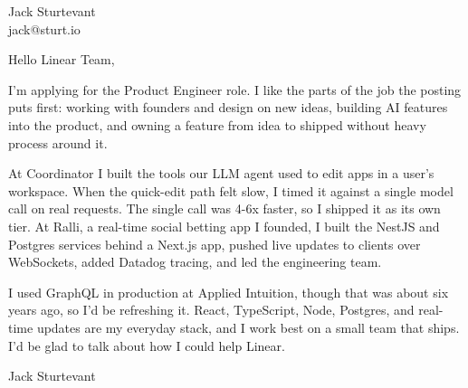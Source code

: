 \documentclass[11pt]{article}
\begin{document}
\raggedright

{\namefont\fontsize{20pt}{24pt}\selectfont Jack Sturtevant}\\[-0.3em]
jack@sturt.io

\vspace{1.2em}

Hello Linear Team,

I'm applying for the Product Engineer role. I like the parts of the job the posting puts first: working with founders and design on new ideas, building AI features into the product, and owning a feature from idea to shipped without heavy process around it.

At Coordinator I built the tools our LLM agent used to edit apps in a user's workspace. When the quick-edit path felt slow, I timed it against a single model call on real requests. The single call was 4-6x faster, so I shipped it as its own tier. At Ralli, a real-time social betting app I founded, I built the NestJS and Postgres services behind a Next.js app, pushed live updates to clients over WebSockets, added Datadog tracing, and led the engineering team.

I used GraphQL in production at Applied Intuition, though that was about six years ago, so I'd be refreshing it. React, TypeScript, Node, Postgres, and real-time updates are my everyday stack, and I work best on a small team that ships. I'd be glad to talk about how I could help Linear.

\vspace{0.6em}
Jack Sturtevant
\end{document}
